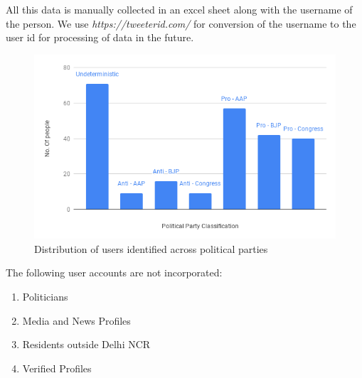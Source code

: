 \documentclass[a4paper,11pt]{article}
\begin{document}
All this data is manually collected in an excel sheet along with the username of the person. We use \textit{https://tweeterid.com/} for conversion of the username to the user id for processing of data in the future. \medskip\\
\newpage
\begin{figure}[h]
\includegraphics[width=\linewidth]{chart.png}
\caption{Distribution of users identified across political parties}
\label{fig:partyDistribution}
\end{figure}
The following user accounts are not incorporated:
\begin{enumerate}
    \item Politicians
    \item Media and News Profiles
    \item Residents outside Delhi NCR
    \item Verified Profiles
\end{enumerate}
\newpage
\end{document}
